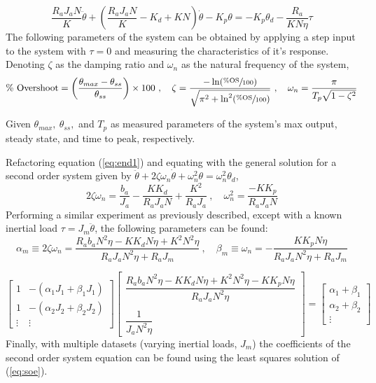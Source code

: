 \documentclass[12pt]{report}
\begin{document}
\begin{equation}
  \frac{R_aJ_aN}{K}\ddot{\theta} + \left( \frac{R_aJ_aN}{K} - K_d + KN \right)\dot{\theta} - K_p\theta = -K_p\theta_d - \frac{R_a}{KN\eta}\tau
  \label{eq:end1}
\end{equation}
\newpage
The following parameters of the system can be obtained by applying a step input to the system with $\tau=0$ and measuring the characteristics of it's response. Denoting $\zeta$ as the damping ratio and $\omega_n$ as the natural frequency of the system,
\[
  \text{\% Overshoot} = \left( \frac{\theta_{max} - \theta_{ss}}{\theta_{ss}} \right) \times 100~,\quad \zeta = \frac{-\ln(\sfrac{\%\text{OS}}{100})}{\sqrt{\pi^2 + \ln^2(\sfrac{\%\text{OS}}{100})}}~,\quad \omega_n = \frac{\pi}{T_p\sqrt{1-\zeta^2}}
\]

Given $\theta_{max},~\theta_{ss},$ and $T_p$ as measured parameters of the system's max output, steady state, and time to peak, respectively.

Refactoring equation (\ref{eq:end1}) and equating with the general solution for a second order system given by $\ddot{\theta} + 2\zeta\omega_n\dot{\theta} + \omega_n^2\theta = \omega_n^2\theta_d$,
\begin{equation}
  2\zeta\omega_n = \frac{b_a}{J_a} - \frac{KK_d}{R_aJ_aN} + \frac{K^2}{R_aJ_a}~,\quad
  \omega_n^2 = \frac{-KK_p}{R_aJ_aN}
\end{equation}
Performing a similar experiment as previously described, except with a known inertial load $\tau = J_m\ddot{\theta}$, the following parameters can be found:
\begin{equation}
  \alpha_m \equiv 2\zeta\omega_n = \frac{R_ab_aN^2\eta-KK_dN\eta+K^2N^2\eta}{R_aJ_aN^2\eta+R_aJ_m}~,\quad
  \beta_m \equiv \omega_n =-\frac{KK_pN\eta}{R_aJ_aN^2\eta+R_aJ_m}
\end{equation}

\begin{equation}
\begin{bmatrix}
  1 & -(\alpha_1J_1+\beta_1J_1) \\
  1 & -(\alpha_2J_2+\beta_2J_2) \\
  \vdots & \vdots
\end{bmatrix}
\begin{bmatrix}
  \dfrac{R_ab_aN^2\eta-KK_dN\eta+K^2N^2\eta-KK_pN\eta}{R_aJ_aN^2\eta} \\
  ~\\
  \dfrac{1}{J_aN^2\eta}
\end{bmatrix}
=
\begin{bmatrix}
  \alpha_1+\beta_1 \\
  \alpha_2+\beta_2 \\
  \vdots
\end{bmatrix}
\label{eq:soe}
\end{equation}
Finally, with multiple datasets (varying inertial loads, $J_m$) the coefficients of the second order system equation can be found using the least squares solution of (\ref{eq:soe}).
\end{document}

